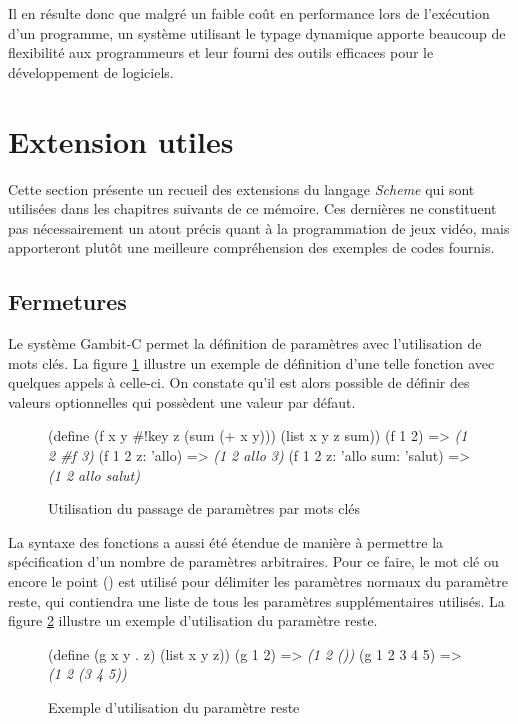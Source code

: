 \documentclass[12pt,twoside,letterpaper,francais]{book}
\newcommand{\Schemelang}{{\textit{Scheme }}}
\newcommand{\scheme}[1]{\selectlanguage{english}{\tt #1}\selectlanguage{french}}
\newcommand{\schemeresult}[1]{{\it #1}}
\begin{document}
Il en résulte donc que malgré un faible coût en performance lors de
l'exécution d'un programme, un système utilisant le typage dynamique
apporte beaucoup de flexibilité aux programmeurs et leur fourni des
outils efficaces pour le développement de logiciels.



\FloatBarrier
\section{Extension utiles}
Cette section présente un recueil des extensions du langage
\Schemelang qui sont utilisées dans les chapitres suivants de ce
mémoire. Ces dernières ne constituent pas nécessairement un atout
précis quant à la programmation de jeux vidéo, mais apporteront plutôt
une meilleure compréhension des exemples de codes fournis.


\FloatBarrier
\subsection{Fermetures}
Le système Gambit-C permet la définition de paramètres avec
l'utilisation de mots clés. La figure \ref{Scheme:fun-key} illustre un
exemple de définition d'une telle fonction avec quelques appels à
celle-ci. On constate qu'il est alors possible de définir des valeurs
optionnelles qui possèdent une valeur par défaut.

\begin{figure}[htb!]
  \begin{schemecode}
(define (f x y \#!key z (sum (+ x y)))
  (list x y z sum))
(f 1 2)                      => \schemeresult{(1 2 \#f 3)}
(f 1 2 z: 'allo)             => \schemeresult{(1 2 allo 3)}
(f 1 2 z: 'allo sum: 'salut) => \schemeresult{(1 2 allo salut)}
  \end{schemecode}
  \caption{Utilisation du passage de paramètres par mots clés}
  \label{Scheme:fun-key}
\end{figure}

La syntaxe des fonctions a aussi été étendue de manière à permettre la
spécification d'un nombre de paramètres arbitraires. Pour ce faire, le
mot clé \scheme{\#!rest} ou encore le point (\scheme{.}) est utilisé
pour délimiter les paramètres normaux du paramètre reste, qui
contiendra une liste de tous les paramètres supplémentaires
utilisés. La figure \ref{Scheme:rest-ex} illustre un exemple
d'utilisation du paramètre reste.

\begin{figure}[htb!]
  \begin{schemecode}
(define (g x y . z) (list x y z))
(g 1 2)       => \schemeresult{(1 2 ())}
(g 1 2 3 4 5) => \schemeresult{(1 2 (3 4 5))}
  \end{schemecode}
  \caption{Exemple d'utilisation du paramètre reste}
  \label{Scheme:rest-ex}
\end{figure}
\end{document}

